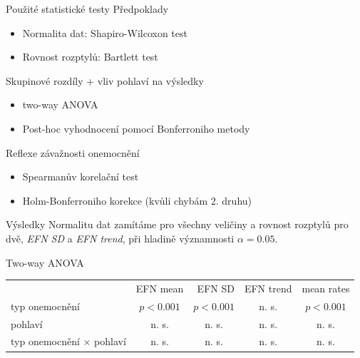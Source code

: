 \documentclass{beamer}
\begin{document}
  \begin{frame}{Použité statistické testy}
  	Předpoklady
  	\begin{itemize}
  		\item Normalita dat: Shapiro-Wilcoxon test
  		\item Rovnost rozptylů: Bartlett test
  	\end{itemize}
    Skupinové rozdíly + vliv pohlaví na výsledky
    \begin{itemize}
    	\item two-way ANOVA
    	\item Post-hoc vyhodnocení pomocí Bonferroniho metody
    \end{itemize}
    Reflexe závažnosti onemocnění
    \begin{itemize}
    	\item Spearmanův korelační test
    	\item Holm-Bonferroniho korekce (kvůli chybám 2. druhu)
    \end{itemize}
  \end{frame}

  \begin{frame}{Výsledky}
  	Normalitu dat zamítáme pro všechny veličiny a rovnost rozptylů pro dvě, \emph{EFN SD} a \emph{EFN trend}, při hladině významnosti $ \alpha=0.05 $.
  	
  	
  	\begin{alertblock}{Two-way ANOVA}
  		\begin{table}[h]
  			\footnotesize
  			\begin{tabular}{l|c|c|c|c|}
  				\multicolumn{1}{r}{}& \multicolumn{1}{r}{EFN mean} & \multicolumn{1}{r}{EFN SD} & \multicolumn{1}{r}{EFN trend} & \multicolumn{1}{r}{mean rates} \\ \cline{2-5}
  				typ onemocnění & $ p< 0.001 $ & $ p< 0.001 $ & n. s. & $ p<0.001 $ \\ \cline{2-5}
  				pohlaví & n. s. & n. s. & n. s. & n. s. \\ \cline{2-5}
  				\makecell{typ onemocnění \\ $ \times $ \\ pohlaví} & n. s. & n. s. & n. s. & n. s. \\ \cline{2-5}
  			\end{tabular}
  		\end{table}
  	\end{alertblock}
  \end{frame}
\end{document}
